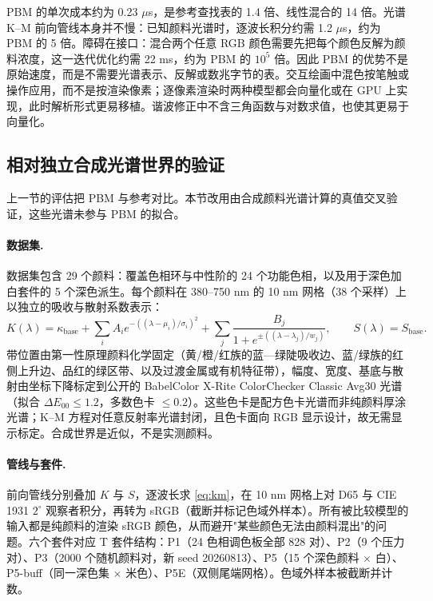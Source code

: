 PBM 的单次成本约为 0.23 $\mu$s，是参考查找表的 1.4 倍、线性混合的 14 倍。光谱 K--M 前向管线本身并不慢：已知颜料光谱时，逐波长积分约需 1.2 $\mu$s，约为 PBM 的 5 倍。障碍在接口：混合两个任意 RGB 颜色需要先把每个颜色反解为颜料浓度，这一迭代优化约需 22 ms，约为 PBM 的 $10^{5}$ 倍。因此 PBM 的优势不是原始速度，而是不需要光谱表示、反解或数兆字节的表。交互绘画中混色按笔触或操作应用，而不是按渲染像素；逐像素渲染时两种模型都会向量化或在 GPU 上实现，此时解析形式更易移植。谐波修正中不含三角函数与对数求值，也使其更易于向量化。

\subsection{相对独立合成光谱世界的验证}
\label{sec:synthetic}

上一节的评估把 PBM 与参考对比。本节改用由合成颜料光谱计算的真值交叉验证，这些光谱未参与 PBM 的拟合。

\paragraph{数据集.}
数据集包含 29 个颜料：覆盖色相环与中性阶的 24 个功能色相，以及用于深色加白套件的 5 个深色派生。每个颜料在 380--750 nm 的 10 nm 网格（38 个采样）上以独立的吸收与散射系数表示：
\begin{equation}
K(\lambda)=\kappa_{\mathrm{base}}+\sum_{i}A_{i}e^{-((\lambda-\mu_{i})/\sigma_{i})^{2}}
+\sum_{j}\frac{B_{j}}{1+e^{\pm((\lambda-\lambda_{j})/w_{j})}},
\qquad S(\lambda)=S_{\mathrm{base}}.
\label{eq:synthetic}
\end{equation}
带位置由第一性原理颜料化学固定（黄/橙/红族的蓝—绿陡吸收边、蓝/绿族的红侧上升边、品红的绿区带、以及过渡金属或有机特征带），幅度、宽度、基底与散射由坐标下降标定到公开的 BabelColor X-Rite ColorChecker Classic Avg30 光谱 \cite{pascale2012}（拟合 $\Delta E_{00}\le1.2$，多数色卡 $\le0.2$）。这些色卡是配方色卡光谱而非纯颜料厚涂光谱；K--M 方程对任意反射率光谱封闭，且色卡面向 RGB 显示设计，故无需显示标定。合成世界是近似，不是实测颜料。

\paragraph{管线与套件.}
前向管线分别叠加 $K$ 与 $S$，逐波长求 \cref{eq:km}，在 10 nm 网格上对 D65 与 CIE 1931 $2^{\circ}$ 观察者积分，再转为 sRGB（截断并标记色域外样本）。所有被比较模型的输入都是纯颜料的渲染 sRGB 颜色，从而避开"某些颜色无法由颜料混出"的问题。六个套件对应 T 套件结构：P1（24 色相调色板全部 828 对）、P2（9 个压力对）、P3（2000 个随机颜料对，新 seed 20260813）、P5（15 个深色颜料 $\times$ 白）、P5-buff（同一深色集 $\times$ 米色）、P5E（双侧尾端网格）。色域外样本被截断并计数。

